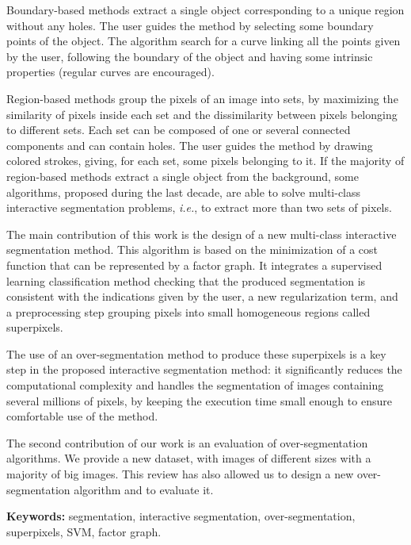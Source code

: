 Boundary-based methods extract a single object corresponding to a unique region without any holes. The user guides the method by selecting some boundary points of the object. The algorithm search for a curve linking all the points given by the user,  following the boundary of the object and having some intrinsic properties (regular curves are encouraged). 
 
Region-based methods group the pixels of an image into sets, by maximizing the similarity of pixels inside each set and the dissimilarity between pixels belonging to different sets. Each set can be composed of one or several connected components and can contain holes. The user guides the method by drawing colored strokes, giving, for each set, some pixels belonging to it.  If the majority of region-based methods extract a single object from the background, some algorithms, proposed during the last decade, are able to solve multi-class interactive segmentation problems, \textit{i.e.}, to extract more than two sets of pixels. 

The main contribution of this work is the design of a new multi-class interactive segmentation method. This algorithm is based on the minimization of a cost function   that can be represented by a factor graph. It integrates a supervised learning classification method checking that the produced segmentation  is consistent with the indications given by the user, a new regularization term, and a preprocessing step grouping pixels into small homogeneous regions called superpixels. 

The use of an over-segmentation method to produce these superpixels is a key step in the proposed interactive segmentation method: it significantly reduces the computational complexity and handles the segmentation of images containing several millions of pixels, by keeping the execution time small enough to ensure comfortable use of the method. 

The second contribution of our work is an evaluation of over-segmentation algorithms. We provide a new dataset, with images of different sizes with a majority of big images. This review has also allowed us to design a new over-segmentation algorithm and to evaluate it. 

\textbf{Keywords:} segmentation, interactive segmentation, over-segmentation, superpixels, SVM, factor graph.

